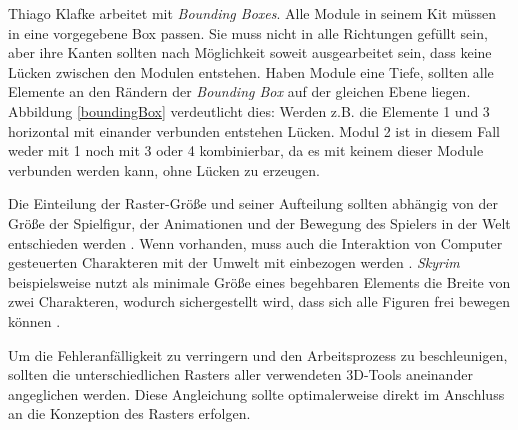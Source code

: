 \par
Thiago Klafke arbeitet mit \textit{Bounding Boxes}. Alle Module in seinem Kit müssen in eine vorgegebene Box passen. Sie muss nicht in alle Richtungen gefüllt sein, aber ihre Kanten sollten nach Möglichkeit soweit ausgearbeitet sein, dass keine Lücken zwischen den Modulen entstehen. Haben Module eine Tiefe, sollten alle Elemente an den Rändern der \textit{Bounding Box} auf der gleichen Ebene liegen. Abbildung \ref{boundingBox} verdeutlicht dies: Werden z.B. die Elemente 1 und 3 horizontal mit einander verbunden entstehen Lücken. Modul 2 ist in diesem Fall weder mit 1 noch mit 3 oder 4 kombinierbar, da es mit keinem dieser Module verbunden werden kann, ohne Lücken zu erzeugen. \parencite{Klafke}
\par
Die Einteilung der Raster-Größe und seiner Aufteilung sollten abhängig von der Größe der Spielfigur, der Animationen und der Bewegung des Spielers in der Welt entschieden werden \parencite{Perry}. Wenn vorhanden, muss auch die Interaktion von Computer gesteuerten Charakteren mit der Umwelt mit einbezogen werden \parencite{Burgess}. \textit{Skyrim} beispielsweise nutzt als minimale Größe eines begehbaren Elements die Breite von zwei Charakteren, wodurch sichergestellt wird, dass sich alle Figuren frei bewegen können \parencite{Burgess}.
\par
Um die Fehleranfälligkeit zu verringern und den Arbeitsprozess zu beschleunigen, sollten die unterschiedlichen Rasters aller verwendeten 3D-Tools aneinander angeglichen werden. Diese Angleichung sollte optimalerweise direkt im Anschluss an die Konzeption des Rasters erfolgen. \parencite{ForHonor}
\enlargethispage{11.5pt}
\par
